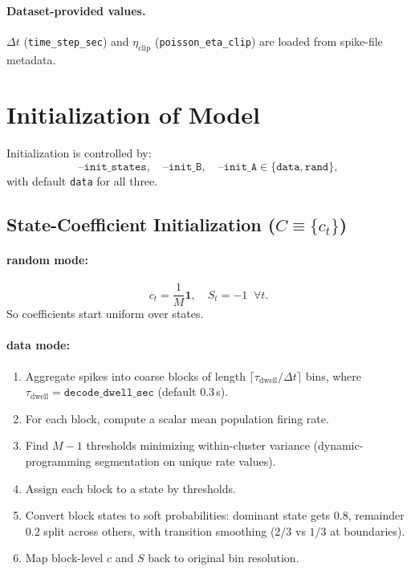 \documentclass[11pt]{article}
\begin{document}
\paragraph{Dataset-provided values.}
\(\Delta t\) (\texttt{time\_step\_sec}) and \(\eta_{\mathrm{clip}}\)
(\texttt{poisson\_eta\_clip}) are loaded from spike-file metadata.

\section{Initialization of Model}
\label{sec:init}

Initialization is controlled by:
\[
\texttt{--init\_states},\quad \texttt{--init\_B},\quad  \texttt{--init\_A}
\in \{\texttt{data},\texttt{rand}\},
\]
with default \texttt{data} for all three.

\subsection{State-Coefficient Initialization (\(C\equiv\{c_t\}\))}

\paragraph{random mode:}
\[
c_t = \frac{1}{M}\mathbf{1},\quad S_t=-1 \;\; \forall t.
\]
So coefficients start uniform over states.

\paragraph{data mode:}
\begin{enumerate}
  \item Aggregate spikes into coarse blocks of length
  \(\lceil\tau_{\mathrm{dwell}}/\Delta t\rceil\) bins, where
  \(\tau_{\mathrm{dwell}}=\texttt{decode\_dwell\_sec}\) (default 0.3\,s).
  \item For each block, compute a scalar mean population firing rate.
  \item Find \(M-1\) thresholds minimizing within-cluster variance
  (dynamic-programming segmentation on unique rate values).
  \item Assign each block to a state by thresholds.
  \item Convert block states to soft probabilities:
  dominant state gets \(0.8\), remainder \(0.2\) split across others,
  with transition smoothing (\(2/3\) vs \(1/3\) at boundaries).
  \item Map block-level \(c\) and \(S\) back to original bin resolution.
\end{enumerate}
\end{document}
